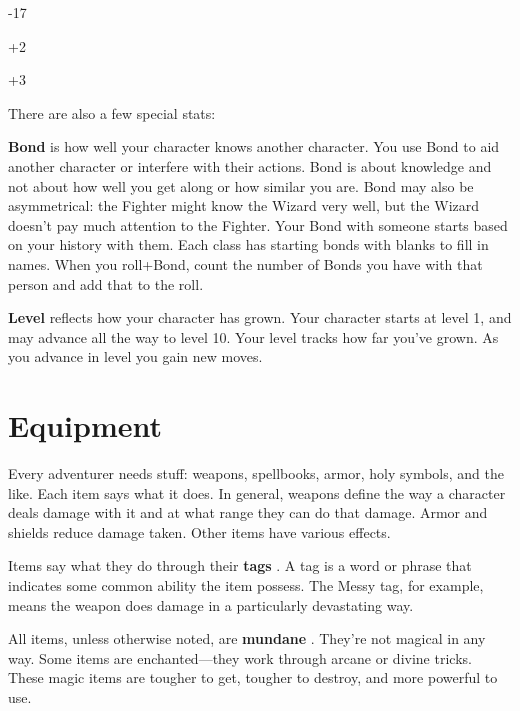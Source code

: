 \eTR
 		
\bTR

-17
\eTD

\bTD
+2
\eTD

\eTR
 		
\bTR

\eTD

\bTD
+3
\eTD

\eTR
 	  
\eTABLE
        

There are also a few special stats:

 

{\bf Bond}  is how well your character knows another character. You use Bond to aid another character or interfere with their actions. Bond is about knowledge and not about how well you get along or how similar you are. Bond may also be asymmetrical: the Fighter might know the Wizard very well, but the Wizard doesn't pay much attention to the Fighter. Your Bond with someone starts based on your history with them. Each class has starting bonds with blanks to fill in names. When you roll+Bond, count the number of Bonds you have with that person and add that to the roll.

 

{\bf Level}  reflects how your character has grown. Your character starts at level 1, and may advance all the way to level 10. Your level tracks how far you've grown. As you advance in level you gain new moves.

 
\section{Equipment}   
 

Every adventurer needs stuff: weapons, spellbooks, armor, holy symbols, and the like. Each item says what it does. In general, weapons define the way a character deals damage with it and at what range they can do that damage. Armor and shields reduce damage taken. Other items have various effects.

 

Items say what they do through their {\bf tags} . A tag is a word or phrase that indicates some common ability the item possess. The Messy tag, for example, means the weapon does damage in a particularly devastating way.

 

All items, unless otherwise noted, are {\bf mundane} . They're not magical in any way. Some items are enchanted—they work through arcane or divine tricks. These magic items are tougher to get, tougher to destroy, and more powerful to use.

